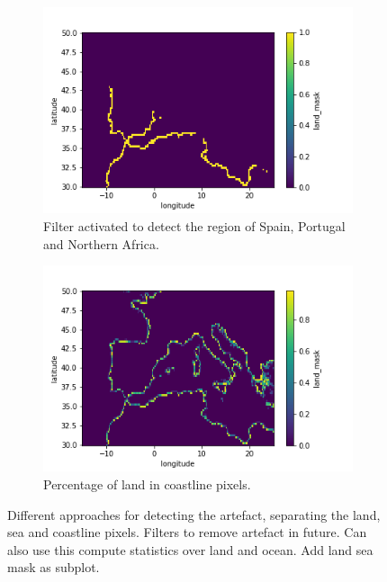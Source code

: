 \begin{figure}[hp]
        \begin{subfigure}[b]{0.475\textwidth}
            \centering
            \includegraphics[scale=0.5]{Chapter4_Results/figurs/restricted_to_artefact.png}
            \caption[Filter activated to detect the region of Spain, Portugal and Northern Africa.]
            {{\small Filter activated to detect the region of Spain, Portugal and Northern Africa.}}
            \label{fig:filter_artefact}
        \end{subfigure}
        \hfill
        \begin{subfigure}[b]{0.475\textwidth}  
            \centering 
            \includegraphics[scale=0.5]{Chapter4_Results/figurs/detecting_coast.png}
            \caption[]%
            {{\small Percentage of land in coastline pixels. }}    
            \label{fig:entire_coastline_detected}
        \end{subfigure}

        \caption[Different approaches for detecting the artefact, separating the land, sea and coastline pixels.]
        {\small Different approaches for detecting the artefact, separating the land, sea and coastline pixels. Filters to remove artefact in future. Can also use this compute statistics over land and ocean. Add land sea mask as subplot. }
        \label{fig:filters}
    \end{figure}

